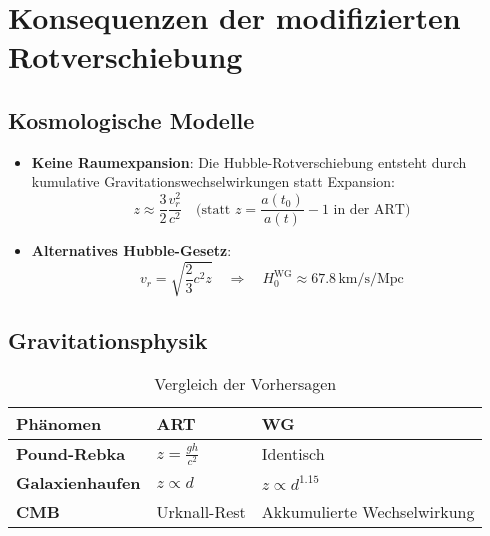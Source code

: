 \newpage
\section{Konsequenzen der modifizierten Rotverschiebung}
\label{sec:redshift_consequences}

\subsection{Kosmologische Modelle}
\begin{itemize}
\item \textbf{Keine Raumexpansion}: Die Hubble-Rotverschiebung entsteht durch kumulative Gravitationswechselwirkungen statt Expansion:
  \begin{equation}
  z \approx \frac{3}{2}\frac{v_r^2}{c^2} \quad \text{(statt } z = \frac{a(t_0)}{a(t)}-1 \text{ in der ART)}
  \end{equation}

\item \textbf{Alternatives Hubble-Gesetz}:
  \begin{equation}
  v_r = \sqrt{\frac{2}{3}c^2 z} \quad \Rightarrow \quad H_0^\text{WG} \approx 67.8\,\text{km/s/Mpc}
  \end{equation}
\end{itemize}

\subsection{Gravitationsphysik}
\begin{table}[h]
\centering
\caption{Vergleich der Vorhersagen}
\begin{tabular}{lll}
\hline
Phänomen & ART & WG \\
\hline
\textbf{Pound-Rebka} & $z=\frac{gh}{c^2}$ & Identisch \\
\textbf{Galaxienhaufen} & $z \propto d$ & $z \propto d^{1.15}$ \\
\textbf{CMB} & Urknall-Rest & Akkumulierte Wechselwirkung \\
\hline
\end{tabular}
\end{table}

